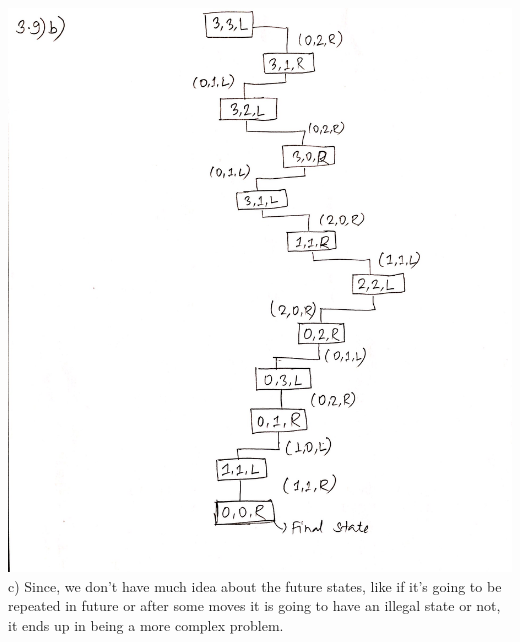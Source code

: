 \documentclass[11pt]{article}
\begin{document}
\includegraphics[width=150mm]{b.jpg}\\
c) Since, we don't have much idea about the future states, like if it's going to be repeated in future or after some moves
it is going to have an illegal state or not, it ends up in being a more complex problem.\\
\end{document}
